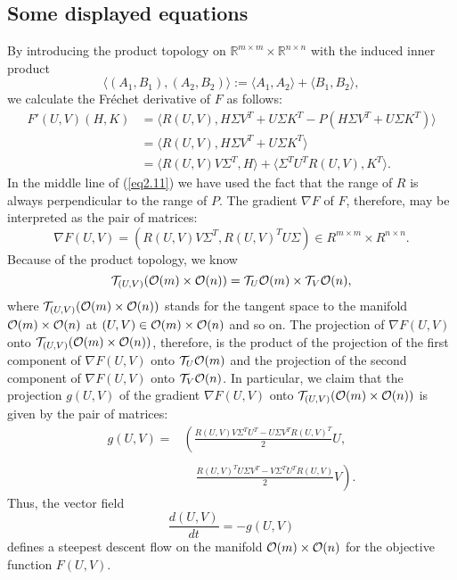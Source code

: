 \subsection{Some displayed equations}
     By introducing the product topology on  $\mathbb{R}^{m \times m} \times
\mathbb{R}^{n \times n}$  with the induced inner product
\begin{equation}
\langle (A_{1},B_{1}), (A_{2},B_{2})\rangle := \langle A_{1},A_{2}\rangle 
+ \langle B_{1},B_{2}\rangle,\label{eq2.10}
\end{equation}
we calculate the Fr\'{e}chet derivative of  $F$  as follows:
\begin{align}
 F'(U,V)(H,K) &= \langle R(U,V),H\Sigma V^{T} + U\Sigma K^{T} -
P(H\Sigma V^{T} + U\Sigma K^{T})\rangle \nonumber \\
         &= \langle R(U,V),H\Sigma V^{T} + U\Sigma K^{T}\rangle \label{eq2.11} \\
&= \langle R(U,V)V\Sigma^{T},H\rangle + \langle \Sigma^{T}U^{T}R(U,V),K^{T}\rangle.     \nonumber
\end{align}
In the middle line of (\ref{eq2.11}) we have used the fact that the range of
$R$ is always perpendicular to the range of $P$.  The gradient $\nabla F$  of
$F$, therefore,  may be interpreted as the
pair of matrices:
\begin{equation}
 \nabla F(U,V) = (R(U,V)V\Sigma^{T},R(U,V)^{T}U\Sigma ) \in
R^{m \times m} \times R^{n \times n}.       			\label{eq2.12}
\end{equation}
Because of the product topology, we know
\begin{equation}
 {\cal T}_{(U,V)}({\cal O} (m) \times {\cal O} (n)) =
{\cal T}_{U}{\cal O} (m) \times {\cal T}_{V}{\cal O} (n),  		\label{eq2.13}
\end{equation}
where  ${\cal T}_{(U,V)}({\cal O} (m) \times {\cal O} (n))$  stands for the
tangent space to the manifold  ${\cal O} (m) \times {\cal O} (n)$  at  $(U,V)
\in {\cal O} (m) \times {\cal O} (n)$  and so on.  The projection of
$\nabla F(U,V)$  onto  ${\cal T}_{(U,V)}({\cal O} (m) \times {\cal O} (n))$,
therefore, is the product of the projection of the first component of
$\nabla F(U,V)$  onto  ${\cal T}_{U}{\cal O} (m)$  and the projection of the
second component of  $\nabla F(U,V)$  onto  ${\cal T}_{V}{\cal O} (n)$. 
In particular, we claim that the
projection $ g(U,V)$  of the gradient  $\nabla F(U,V)$  onto
${\cal T}_{(U,V)}({\cal O} (m) \times {\cal O} (n))$  is given by the pair of
matrices:
\begin{align}
g(U,V) =& \left( \frac{R(U,V)V\Sigma^{T}U^{T}-U\Sigma V^{T}R(U,V)^{T}}{2}U,
\right.			\nonumber \\[-1.5ex]
\label{eq2.14}\\[-1.5ex]
&\quad\!\left. \frac{R(U,V)^{T}U\Sigma V^{T}-V
   \Sigma^{T}U^{T}R(U,V)}{2}V \right).\nonumber
\end{align}
Thus, the vector field
\begin{equation}
\frac{d(U,V)}{dt} = -g(U,V) 	\label{eq2.15}
\end{equation}
defines a steepest descent flow on the manifold  ${\cal O} (m) \times
{\cal O} (n)$ for the objective function  $F(U,V)$.

